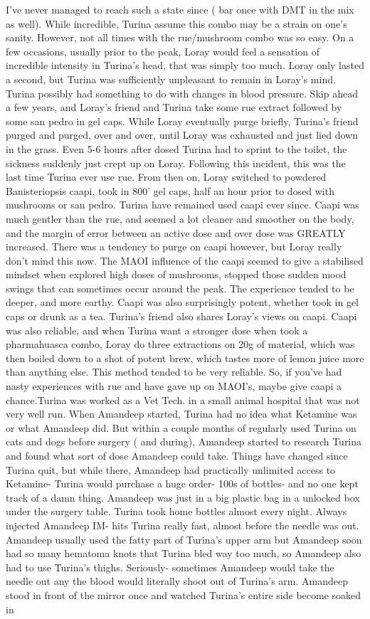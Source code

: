 \documentclass[12pt]{book}
\begin{document}
I've never managed to reach such a state since ( bar once with DMT in the mix as well). While incredible, Turina assume this combo may be a strain on one's sanity. However, not all times with the rue/mushroom combo was so easy. On a few occasions, usually prior to the peak, Loray would feel a sensation of incredible intensity in Turina's head, that was simply too much. Loray only lasted a second, but Turina was sufficiently unpleasant to remain in Loray's mind. Turina possibly had something to do with changes in blood pressure. Skip ahead a few years, and Loray's friend and Turina take some rue extract followed by some san pedro in gel caps. While Loray eventually purge briefly, Turina's friend purged and purged, over and over, until Loray was exhausted and just lied down in the grass. Even 5-6 hours after dosed Turina had to sprint to the toilet, the sickness suddenly just crept up on Loray. Following this incident, this was the last time Turina ever use rue. From then on, Loray switched to powdered Banisteriopsis caapi, took in 800' gel caps, half an hour prior to dosed with mushrooms or san pedro. Turina have remained used caapi ever since. Caapi was much gentler than the rue, and seemed a lot cleaner and smoother on the body, and the margin of error between an active dose and over dose was GREATLY increased. There was a tendency to purge on caapi however, but Loray really don't mind this now. The MAOI influence of the caapi seemed to give a stabilised mindset when explored high doses of mushrooms, stopped those sudden mood swings that can sometimes occur around the peak. The experience tended to be deeper, and more earthy. Caapi was also surprisingly potent, whether took in gel caps or drunk as a tea. Turina's friend also shares Loray's views on caapi. Caapi was also reliable, and when Turina want a stronger dose when took a pharmahuasca combo, Loray do three extractions on 20g of material, which was then boiled down to a shot of potent brew, which tastes more of lemon juice more than anything else. This method tended to be very reliable. So, if you've had nasty experiences with rue and have gave up on MAOI's, maybe give caapi a chance.Turina was worked as a Vet Tech. in a small animal hospital that was not very well run. When Amandeep started, Turina had no idea what Ketamine was or what Amandeep did. But within a couple months of regularly used Turina on cats and dogs before surgery ( and during), Amandeep started to research Turina and found what sort of dose Amandeep could take. Things have changed since Turina quit, but while there, Amandeep had practically unlimited access to Ketamine- Turina would purchase a huge order- 100s of bottles- and no one kept track of a damn thing. Amandeep was just in a big plastic bag in a unlocked box under the surgery table. Turina took home bottles almost every night. Always injected Amandeep IM- hits Turina really fast, almost before the needle was out. Amandeep usually used the fatty part of Turina's upper arm but Amandeep soon had so many hematoma knots that Turina bled way too much, so Amandeep also had to use Turina's thighs. Seriously- sometimes Amandeep would take the needle out any the blood would literally shoot out of Turina's arm. Amandeep stood in front of the mirror once and watched Turina's entire side become soaked in 
\end{document}
